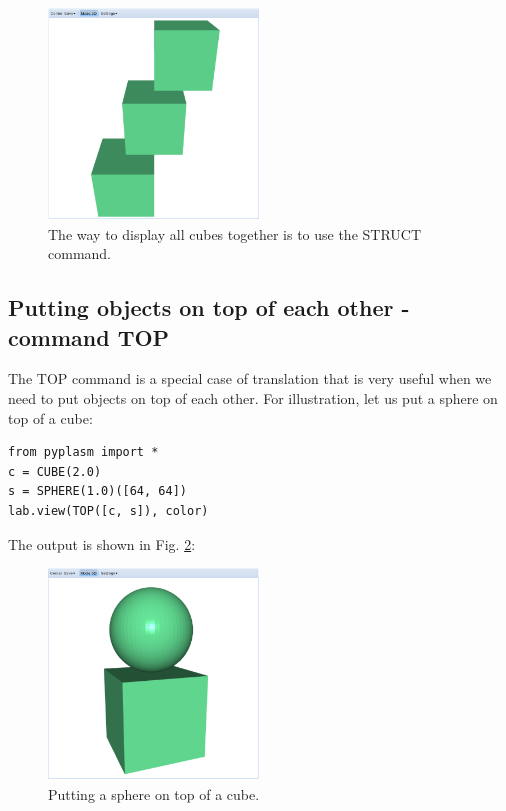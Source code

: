 \documentclass{article}
\begin{document}
\begin{figure}[!ht]
\begin{center}
\includegraphics[width=0.5\textwidth]{img/comp-1.png}
\end{center}
\vspace{-2mm}
\caption{The way to display all cubes together is to use the STRUCT command.}
\label{fig:comp-1}
\end{figure}


\subsection{Putting objects on top of each other - command TOP}

The TOP command is a special case of translation that is very 
useful when we need to put objects on top of each other.
For illustration, let us put a sphere on top of a cube:

\begin{verbatim}
from pyplasm import *
c = CUBE(2.0)
s = SPHERE(1.0)([64, 64])
lab.view(TOP([c, s]), color)
\end{verbatim}
The output is shown in Fig. \ref{fig:top-1}:

\newpage

\begin{figure}[!ht]
\begin{center}
\includegraphics[width=0.5\textwidth]{img/top-1.png}
\end{center}
\vspace{-2mm}
\caption{Putting a sphere on top of a cube.}
\label{fig:top-1}
\end{figure}
\end{document}
